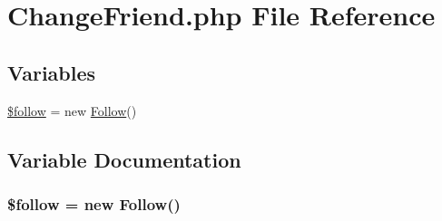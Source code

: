 \hypertarget{_change_friend_8php}{}\section{Change\+Friend.\+php File Reference}
\label{_change_friend_8php}
\subsection*{Variables}
\begin{DoxyCompactItemize}
\item 
\hyperlink{_change_friend_8php_ab5929d3bc848873a208b38b88e7b226c}{\$follow} = new \hyperlink{class_follow}{Follow}()
\end{DoxyCompactItemize}


\subsection{Variable Documentation}
\subsubsection[{\texorpdfstring{\$follow}{$follow}}]{\setlength{\rightskip}{0pt plus 5cm}\$follow = new {\bf Follow}()}\hypertarget{_change_friend_8php_ab5929d3bc848873a208b38b88e7b226c}{}\label{_change_friend_8php_ab5929d3bc848873a208b38b88e7b226c}

